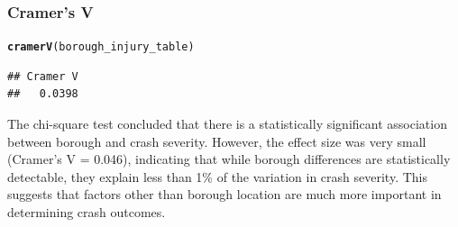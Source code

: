 \documentclass[10pt]{article}\usepackage[]{graphicx}\usepackage[]{xcolor}
\makeatletter
\newcommand{\hldef}[1]{\textcolor[rgb]{0.345,0.345,0.345}{#1}}%
\newcommand{\hlkwd}[1]{\textcolor[rgb]{0.737,0.353,0.396}{\textbf{#1}}}%
\newenvironment{kframe}{%
 \def\at@end@of@kframe{}%
 \ifinner\ifhmode%
  \def\at@end@of@kframe{\end{minipage}}%
  \begin{minipage}{\columnwidth}%
 \fi\fi%
 \def\FrameCommand##1{\hskip\@totalleftmargin \hskip-\fboxsep
 \colorbox{shadecolor}{##1}\hskip-\fboxsep
     \hskip-\linewidth \hskip-\@totalleftmargin \hskip\columnwidth}%
 \MakeFramed {\advance\hsize-\width
   \@totalleftmargin\z@ \linewidth\hsize
   \@setminipage}}%
 {\par\unskip\endMakeFramed%
 \at@end@of@kframe}
\newenvironment{knitrout}{}{} %
\makeatother
\begin{document}
\subsubsection{Cramer’s V}



\begin{knitrout}
\color{fgcolor}\begin{kframe}
\begin{alltt}
\hlkwd{cramerV}\hldef{(borough_injury_table)}
\end{alltt}
\begin{verbatim}
## Cramer V 
##   0.0398
\end{verbatim}
\end{kframe}
\end{knitrout}

The chi-square test concluded that there is a statistically significant association between borough and crash severity. However, the effect size was very small (Cramer's V = 0.046), indicating that while borough differences are statistically detectable, they explain less than 1\% of the variation in crash severity. This suggests that factors other than borough location are much more important in determining crash outcomes.
\end{document}
